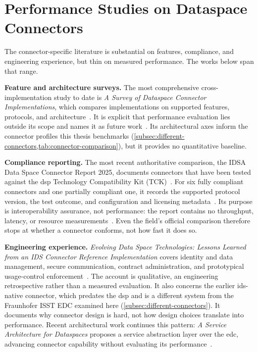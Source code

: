 \section{Performance Studies on Dataspace Connectors}\label{sec:rw-connector-studies}

The connector-specific literature is substantial on features, compliance, and engineering experience, but thin on measured performance. The works below span that range.

\textbf{Feature and architecture surveys.} The most comprehensive cross-implementation study to date is \emph{A Survey of Dataspace Connector Implementations}, which compares implementations on supported features, protocols, and architecture~\citep{dam2024surveydataspaceconnectorimplementations}. It is explicit that performance evaluation lies outside its scope and names it as future work~\citep{dam2024surveydataspaceconnectorimplementations}. Its architectural axes inform the connector profiles this thesis benchmarks (\cref{subsec:different-connectors,tab:connector-comparison}), but it provides no quantitative baseline.

\textbf{Compliance reporting.} The most recent authoritative comparison, the IDSA Data Space Connector Report 2025, documents connectors that have been tested against the \gls{dsp} Technology Compatibility Kit (TCK)~\citep{idsaConnectorReport2025}. For six fully compliant connectors and one partially compliant one, it records the supported protocol version, the test outcome, and configuration and licensing metadata~\citep{idsaConnectorReport2025}. Its purpose is interoperability assurance, not performance: the report contains no throughput, latency, or resource measurements~\citep{idsaConnectorReport2025}. Even the field's official comparison therefore stops at whether a connector conforms, not how fast it does so.

\textbf{Engineering experience.} \emph{Evolving Data Space Technologies: Lessons Learned from an IDS Connector Reference Implementation} covers identity and data management, secure communication, contract administration, and prototypical usage-control enforcement~\citep{pampus2022evolving}. The account is qualitative, an engineering retrospective rather than a measured evaluation. It also concerns the earlier \gls{ids}-native connector, which predates the \gls{dsp} and is a different system from the Fraunhofer ISST EDC examined here (\cref{subsec:different-connectors}). It documents why connector design is hard, not how design choices translate into performance. Recent architectural work continues this pattern: \emph{A Service Architecture for Dataspaces} proposes a service abstraction layer over the \gls{edc}, advancing connector capability without evaluating its performance~\citep{arnold2025servicearchitecture}.


